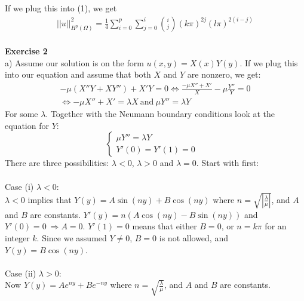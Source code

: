 \documentclass[11pt,a4paper]{report}
\begin{document}
If we plug this into (1), we get
\begin{gather}
||u||_{H^p(\Omega)}^2 = \frac{1}{4}\sum_{i=0}^p \sum_{j=0}^{i}\binom {i} {j}(k\pi)^{2j}(l\pi)^{2(i-j)}  
\end{gather}
\\
\textbf{Exercise 2}
\\
a) Assume our solution is on the form $u(x,y)=X(x)Y(y)$. If we plug this into our equation and assume that both $X$ and $Y$ are nonzero, we get:
\begin{gather}
-\mu(X''Y+XY'') + X'Y = 0 \iff \frac{- \mu X''+X'}{X} - \mu\frac{Y''}{Y}=0 \\
\iff - \mu X''+X'=\lambda X \ \text{and} \ \mu Y'' = \lambda Y
\end{gather} 
For some $\lambda$. Together with the Neumann boundary conditions look at the equation for $Y$: 
\begin{displaymath}
   \left\{
     \begin{array}{lr}
       \mu Y''=\lambda Y &   \\
       Y'(0)=Y'(1)=0 &  
     \end{array}
   \right.
\end{displaymath}
There are three possibilities: $\lambda<0 $, $\lambda>0 $ and $\lambda=0$. Start with first:
\\
\\
Case (i) $\lambda<0$: 
\\
$\lambda<0$ implies that $Y(y)=A\sin(ny)+B\cos(ny)$ where $n=\sqrt{|\frac{\lambda}{\mu}|}$, and $A$ and $B$ are constants. $Y'(y)=n(A\cos(ny)-B\sin(ny))$ and $Y'(0)=0 \ \Rightarrow A=0$. $Y'(1)=0$ means that either $B=0$, or $n=k\pi$ for an integer $k$. Since we assumed $Y\neq0$, $B=0$ is not allowed, and $Y(y) = B\cos(ny)$.
\\
\\
Case (ii) $\lambda>0$:
\\
Now $Y(y) = Ae^{ny}+Be^{-ny}$ where $n=\sqrt{\frac{\lambda}{\mu}}$, and $A$ and $B$ are constants.
\end{document}
